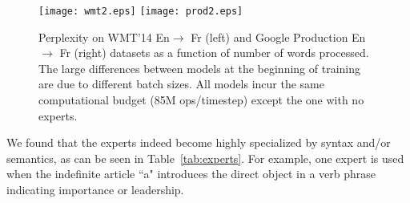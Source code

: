 \documentclass{article} %
\begin{document}
\begin{figure}[h!]
\centering
    \texttt{[image: wmt2.eps]}
    \texttt{[image: prod2.eps]}
    \caption{Perplexity on WMT'14 En$\rightarrow$ Fr (left) and Google Production En$\rightarrow$ Fr (right) datasets as a function of number of words processed.  The large differences between models at the beginning of training are due to different batch sizes.  All models incur the same computational budget (85M ops/timestep) except the one with no experts.}
    \label{fig:mt}
\end{figure}

We found that the experts indeed become highly specialized by syntax and/or semantics, as can be seen in Table~\ref{tab:experts}.  For example, one expert is used when the indefinite article ``a" introduces the direct object in a verb phrase indicating importance or leadership.

\begin{table}[h!]
\caption{Contexts corresponding to a few of the 2048 experts in the MoE layer in the encoder portion of the WMT'14 En$\rightarrow$ Fr translation model.  For each expert $i$, we sort the inputs in a training batch in decreasing order of $G(x)_i$, and show the words surrounding the corresponding positions in the input sentences. }
\label{tab:experts}
\centering
\label{Table}
\end{table}
\end{document}
